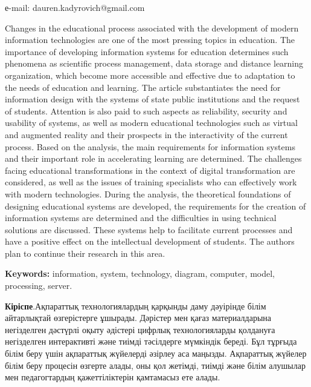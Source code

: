 е-mail: dauren.kadyrovich@gmail.com

Changes in the educational process associated with the development of
modern information technologies are one of the most pressing topics in
education. The importance of developing information systems for
education determines such phenomena as scientific process management,
data storage and distance learning organization, which become more
accessible and effective due to adaptation to the needs of education and
learning. The article substantiates the need for information design with
the systems of state public institutions and the request of students.
Attention is also paid to such aspects as reliability, security and
usability of systems, as well as modern educational technologies such as
virtual and augmented reality and their prospects in the interactivity
of the current process. Based on the analysis, the main requirements for
information systems and their important role in accelerating learning
are determined. The challenges facing educational transformations in the
context of digital transformation are considered, as well as the issues
of training specialists who can effectively work with modern
technologies. During the analysis, the theoretical foundations of
designing educational systems are developed, the requirements for the
creation of information systems are determined and the difficulties in
using technical solutions are discussed. These systems help to
facilitate current processes and have a positive effect on the
intellectual development of students. The authors plan to continue their
research in this area.

{\bfseries Keywords:} information, system, technology, diagram, computer,
model, processing, server.

{\bfseries Кіріспе}.Ақпараттық технологиялардың қарқынды даму дәуірінде
білім айтарлықтай өзгерістерге ұшырады. Дәрістер мен қағаз
материалдарына негізделген дәстүрлі оқыту әдістері цифрлық
технологияларды қолдануға негізделген интерактивті және тиімді
тәсілдерге мүмкіндік береді. Бұл тұрғыда білім беру үшін ақпараттық
жүйелерді әзірлеу аса маңызды. Ақпараттық жүйелер білім беру процесін
өзгерте алады, оны қол жетімді, тиімді және білім алушылар мен
педагогтардың қажеттіліктерін қамтамасыз ете алады.

